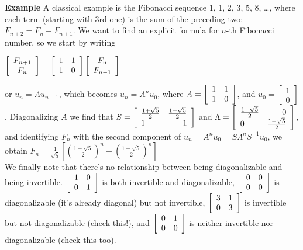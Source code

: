 \documentclass[12pt,oneside]{article}
\begin{document}
\textbf{Example} A classical example is the Fibonacci sequence 1, 1, 2, 3, 5, 8, \ldots,
where each term (starting with 3rd one) is the sum of the preceding
two: $F_{n+2} = F_{n} + F_{n+1}$. We want to find an explicit formula
for $n$-th Fibonacci number, so we start by writing\\
\begin{center}
$\left[ \begin{array} {c} F_{n+1} \\ F_{n} \end{array} \right] =
\left[ \begin{array} {l r} 1 & 1 \\ 1 & 0 \end{array} \right] \left[
  \begin{array} {c} F_{n} \\ F_{n-1} \end{array} \right]$
\end{center}
or $u_{n} = A u_{n-1}$, which becomes $u_{n} = A^n u_0$, where $A =
\left[ \begin{array} {l r} 1 & 1 \\ 1 & 0 \end{array} \right]$, and
$u_0 = \left[ \begin{array} {c} 1 \\ 0 \end{array}
\right]$. Diagonalizing $A$ we find that $S = \left[ \begin{array} {l
      r} \frac{1 + \sqrt{5}}{2} & \frac{1 - \sqrt{5}}{2} \\ 1 & 1
  \end{array} \right]$ and $\Lambda = \left[ \begin{array} {l r}
    \frac{1 + \sqrt{5}}{2} & 0 \\ 0 & \frac{1-\sqrt{5}}{2} \end{array}
    \right]$, and identifying $F_{n}$ with the second component of
    $u_n = A^n u_0 = S \Lambda^n S^{-1} u_0$, we obtain $F_n =
    \frac{1}{\sqrt{5}} \left[ {\left( \frac{1 + \sqrt{5}}{2} \right)}^n
    - {\left( \frac{1 - \sqrt{5}}{2} \right)}^n \right]$\\
We finally note that there's no relationship between being
    diagonalizable and being invertible. $\left[ \begin{array} {l r} 1
    & 0 \\ 0 & 1 \end{array} \right]$ is both invertible and
    diagonalizable, $\left[ \begin{array} {l r} 0
    & 0 \\ 0 & 0 \end{array} \right]$ is diagonalizable (it's already
    diagonal) but not invertible, $\left[ \begin{array} {l r} 3
    & 1 \\ 0 & 3 \end{array} \right]$ is invertible but not
    diagonalizable (check this!), and $\left[ \begin{array} {l r} 0
    & 1 \\ 0 & 0 \end{array} \right]$ is neither invertible nor
    diagonalizable (check this too).
\end{document}
